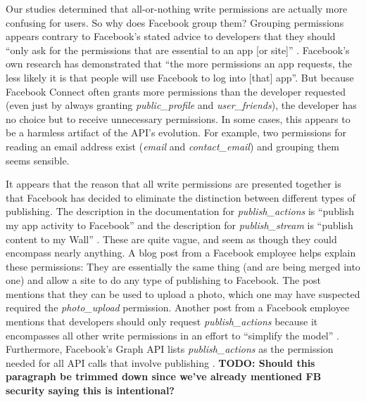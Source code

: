 \documentclass[10pt]{sig-alternate-10pt}
\begin{document}
Our studies determined that all-or-nothing write permissions are actually more confusing for users. So why does Facebook group them?
Grouping permissions appears contrary to Facebook's stated advice to developers that they should ``only ask for the permissions that are essential to an app [or site]'' \cite{fbpermsinstructions}. Facebook's own research has demonstrated that ``the more permissions an app requests, the less likely it is that people will use Facebook to log into [that] app''\cite{fbpermsinstructions}.
But because Facebook Connect often grants more permissions than the developer requested (even just by always granting \emph{public\_profile} and \emph{user\_friends}), the developer has no choice but to receive unnecessary permissions.
In some cases, this appears to be a harmless artifact of the API's evolution.
For example, two permissions for reading an email address exist (\emph{email} and \emph{contact\_email}) and grouping them seems sensible. %

It appears that the reason that all write permissions are presented together is that Facebook has decided to eliminate the distinction between different types of publishing. The description in the documentation for \emph{publish\_actions} is ``publish my app activity to Facebook'' and the description for \emph{publish\_stream} is ``publish content to my Wall'' \cite{fbpermissions}. These are quite vague, and seem as though they could encompass nearly anything. A blog post from a Facebook employee \cite{publishperms} helps explain these permissions: They are essentially the same thing (and are being merged into one) and allow a site to do any type of publishing to Facebook. The post mentions that they can be used to upload a photo, which one may have suspected required the \emph{photo\_upload} permission. Another post from a Facebook employee mentions that developers should only request \emph{publish\_actions} because it encompasses all other write permissions in an effort to ``simplify the model'' \cite{clarity}. Furthermore, Facebook's Graph API lists \emph{publish\_actions} as the permission needed for all API calls that involve publishing \cite{fbapi}. \textbf{TODO: Should this paragraph be trimmed down since we've already mentioned FB security saying this is intentional?}
\end{document}
